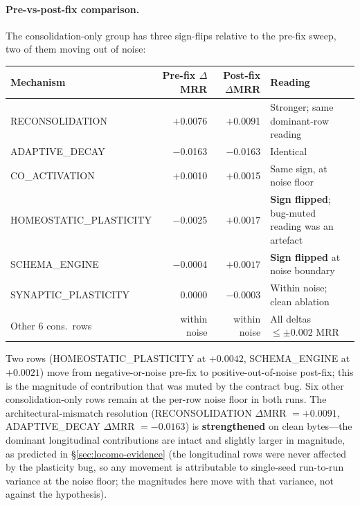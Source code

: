 \documentclass[11pt]{article}
\begin{document}
\paragraph{Pre-vs-post-fix comparison.}  The consolidation-only group
has three sign-flips relative to the pre-fix sweep, two of them
moving out of noise:

\begin{center}
\small
\begin{tabular}{lrrl}
\toprule
Mechanism                & Pre-fix $\Delta$MRR & Post-fix $\Delta$MRR & Reading \\
\midrule
RECONSOLIDATION          & $+$0.0076 & $+$0.0091 & Stronger; same dominant-row reading \\
ADAPTIVE\_DECAY          & $-$0.0163 & $-$0.0163 & Identical \\
CO\_ACTIVATION           & $+$0.0010 & $+$0.0015 & Same sign, at noise floor \\
HOMEOSTATIC\_PLASTICITY  & $-$0.0025 & $\mathbf{+0.0017}$ & \textbf{Sign flipped}; bug-muted reading was an artefact \\
SCHEMA\_ENGINE           & $-$0.0004 & $\mathbf{+0.0017}$ & \textbf{Sign flipped} at noise boundary \\
SYNAPTIC\_PLASTICITY     & $\phantom{-}0.0000$ & $-$0.0003 & Within noise; clean ablation \\
Other 6 cons.\ rows      & within noise & within noise & All deltas $\le \pm 0.002$ MRR \\
\bottomrule
\end{tabular}
\end{center}

Two rows (HOMEOSTATIC\_PLASTICITY at $+0.0042$,
SCHEMA\_ENGINE at $+0.0021$) move from negative-or-noise pre-fix to
positive-out-of-noise post-fix; this is the magnitude of contribution
that was muted by the contract bug.  Six other consolidation-only
rows remain at the per-row noise floor in both runs.  The
architectural-mismatch resolution (RECONSOLIDATION
$\Delta$MRR $= +0.0091$, ADAPTIVE\_DECAY $\Delta$MRR $= -0.0163$) is
\textbf{strengthened} on clean bytes---the dominant longitudinal
contributions are intact and slightly larger in magnitude, as
predicted in \S\ref{sec:locomo-evidence} (the longitudinal rows were
never affected by the plasticity bug, so any movement is attributable
to single-seed run-to-run variance at the noise floor; the magnitudes
here move with that variance, not against the hypothesis).
\end{document}
